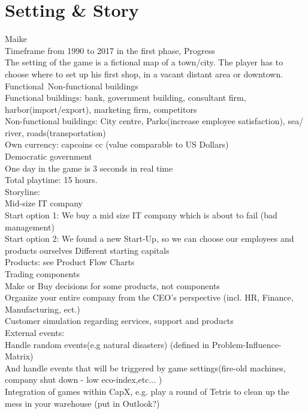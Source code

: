 \documentclass[11pt,titlepage,oneside,openany]{book}
\begin{document}
\section{Setting \& Story}
\label{SettingStory}
Maike\\
Timeframe from 1990 to 2017 in the first phase, Progress\\
The setting of the game is a fictional map of a town/city.  The player has to choose where to set up his first shop, in a vacant distant area or downtown.\\
Functional\ Non-functional buildings\\
Functional buildings: bank, government building, consultant firm, harbor(import/export), marketing firm, competitors \\
Non-functional buildings: City centre, Parks(increase employee satisfaction), sea/ river, roads(transportation)\\
Own currency: capcoins cc (value comparable to US Dollars) \\
Democratic government \\
One day in the game is 3 seconds in real time\\
Total playtime: 15 hours.\\
Storyline:\\
Mid-size IT company\\
Start option 1: We buy a mid size IT company which is about to fail 
(bad management)\\
Start option 2: We found a new Start-Up, so we can choose our employees and products ourselves
Different starting capitals\\
Products: see Product Flow Charts\\
Trading components\\
Make or Buy decisions for some products, not components\\
Organize your entire company from the CEO's perspective (incl. HR, Finance, Manufacturing, ect.)\\
Customer simulation regarding services, support and products \\
External events:\\
Handle random events(e.g natural disasters) (defined in Problem-Influence-Matrix)\\
And handle events that will be triggered by game settings(fire-old machines, company shut down - low eco-index,etc... )\\
Integration of games within CapX, e.g. play a round of Tetris to clean up the mess  in your warehouse (put in Outlook?)\\
\end{document}
